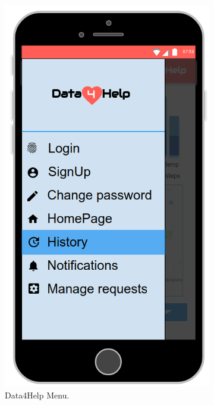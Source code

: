 \begin{figure}[ht]
    \centering
    \begin{subfigure}[t]{0.38\linewidth}
        \includegraphics[width=\linewidth]{images/Mockup/Menu.png}
        \caption{Data4Help Menu.}
    \end{subfigure} \hfil \hfil \hfil
    \begin{subfigure}[t]{0.38\linewidth}

\end{subfigure}
\end{figure}
